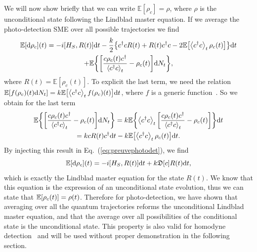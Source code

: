 We will now show briefly that we can write $\mathbb{E}[\rho_c]=\rho$, where $\rho$ is the unconditional state following the Lindblad master equation. If we average the photo-detection SME over all possible trajectories we find
\begin{multline}\label{eq:preuvephotodet}
    \mathbb{E}[\mathrm{d}\rho_c](t) = -i\qty[H_S,R(t)]\mathrm{d}t-\frac{k}{2}\qty{c^\dagger c R(t) + R(t)c^\dagger c - 2\mathbb{E}\qty[\expval{c^\dagger c}_t \rho_c(t)]}\mathrm{d}t\\
    + \mathbb{E}\qty{\qty[\frac{c\rho_c(t)c^\dagger}{\expval{c^\dagger c}_t}-\rho_c(t)]\mathrm{d}N_t},
\end{multline}
where $R(t)=\mathbb{E}[\rho_c(t)]$. To explicit the last term, we need the relation $\mathbb{E}\qty[f(\rho_c)(t)\mathrm{d}N_t]=k\mathbb{E}\qty[\expval{c^\dagger c}_t f(\rho_c)(t)]\mathrm{d}t$, where $f$ is a generic function~\cite{WM}. So we obtain for the last term
\begin{multline}
    \mathbb{E}\qty{\qty[\frac{c\rho_c(t)c^\dagger}{\expval{c^\dagger c}_t}-\rho_c(t)]\mathrm{d}N_t} = k \mathbb{E}\qty{\expval{c^\dagger c}_t \qty[\frac{c\rho_c(t)c^\dagger}{\expval{c^\dagger c}_t}-\rho_c(t)]}\mathrm{d}t \\
    = kcR(t)c^\dagger\mathrm{d}t - k\mathbb{E}\qty[\expval{c^\dagger c}_t\rho_c(t)]\mathrm{d}t.
\end{multline}
By injecting this result in Eq.~(\ref{eq:preuvephotodet}), we find
\begin{equation}
    \mathbb{E}[\mathrm{d}\rho_c](t) = -i\qty[H_S,R(t)]\mathrm{d}t + k\mathfrak{D}[c]R(t)\mathrm{d}t,
\end{equation}
which is exactly the Lindblad master equation for the state $R(t)$. We know that this equation is the expression of an unconditional state evolution, thus we can state that $\mathbb{E}\qty[\rho_c(t)]=\rho(t)$. Therefore for photo-detection, we have shown that averaging over all the quantum trajectories reforms the unconditional Lindblad master equation, and that the average over all possibilities of the conditional state is the unconditional state. This property is also valid for homodyne detection~\cite{W96,Jacobs2006,Rouchon2022} and will be used without proper demonstration in the following section. 
